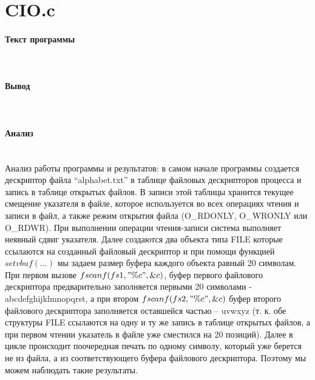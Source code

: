 \section{CIO.c}

\paragraph{Текст программы}\hfill\\



\paragraph{Вывод}\hfill\\


\paragraph{Анализ}\hfill\\
Анализ работы программы и результатов: в самом начале программы создается дескриптор файла “alphabet.txt” в таблице файловых дескрипторов процесса и запись в таблице открытых файлов. В записи этой таблицы хранится текущее смещение указателя в файле, которое используется во всех операциях чтения и записи в файл,
а также режим открытия файла (O\_RDONLY, O\_WRONLY или O\_RDWR). При выполнении операции чтения-записи система выполняет неявный сдвиг указателя. Далее создаются два объекта типа FILE которые ссылаются на созданный файловый дескриптор и при помощи функцией $setvbuf(…)$ мы задаем размер буфера каждого объекта равный 20 символам.
При первом вызове $fscanf(fs1,"\%c",\&c)$, буфер первого файлового дескриптора предварительно заполняется первыми 20 символами - abcdefghijklmnopqrst,
а при втором $fscanf(fs2,"\%c",\&c)$ буфер второго файлового дескриптора заполняется оставшейся частью – uvwxyz (т. к. обе структуры FILE ссылаются на одну и ту же запись в таблице открытых файлов, а при первом чтении указатель в файле уже сместился на 20 позиций). Далее в цикле происходит поочередная печать по одному символу, который уже берется не из файла, а из соответствующего буфера файлового дескриптора. Поэтому мы можем наблюдать такие результаты.
 